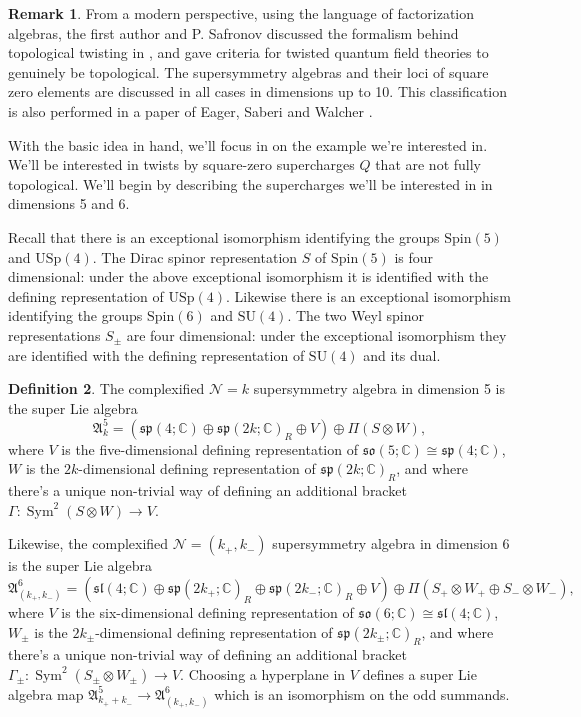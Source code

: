 \documentclass[11pt, oneside, reqno]{amsart}
\theoremstyle{definition} \newtheorem{definition}{Definition}[section]
\theoremstyle{definition} \newtheorem{remark}[definition]{Remark}
\theoremstyle{definition} \newtheorem{remarks}[definition]{Remarks}
\theoremstyle{definition} \newtheorem{question}[definition]{Question}
\theoremstyle{definition} \newtheorem*{note}{Note}
\theoremstyle{definition} \newtheorem{example}[definition]{Example}
\theoremstyle{definition} \newtheorem{examples}[definition]{Examples}
\newcommand{\mr}[1]{\mathrm{#1}}
\newcommand{\mc}[1]{\mathcal{#1}}
\newcommand{\mf}[1]{\mathfrak{#1}}
\newcommand{\CC}{\mathbb{C}}
\newcommand{\SU}{\mathrm{SU}}
\newcommand{\Spin}{\mathrm{Spin}}
\newcommand{\so}{\mathfrak{so}}
\renewcommand{\sl}{\mathfrak{sl}}
\renewcommand{\sp}{\mathfrak{sp}}
\newcommand{\iso}{\cong}
\DeclareMathOperator{\sym}{Sym}
\begin{document}
\begin{remark}
From a modern perspective, using the language of factorization algebras, the first author and P. Safronov discussed the formalism behind topological twisting in \cite{ElliottSafronov}, and gave criteria for twisted quantum field theories to genuinely be topological.  The supersymmetry algebras and their loci of square zero elements are discussed in all cases in dimensions up to 10.  This classification is also performed in a paper of Eager, Saberi and Walcher \cite{EagerSaberiWalcher}.
\end{remark}

With the basic idea in hand, we'll focus in on the example we're interested in.  We'll be interested in twists by square-zero supercharges $Q$ that are not fully topological.  We'll begin by describing the supercharges we'll be interested in in dimensions 5 and 6.

Recall that there is an exceptional isomorphism identifying the groups $\Spin(5)$ and $\mr{USp}(4)$.  The Dirac spinor representation $S$ of $\Spin(5)$ is four dimensional: under the above exceptional isomorphism it is identified with the defining representation of $\mr{USp}(4)$.  Likewise there is an exceptional isomorphism identifying the groups $\Spin(6)$ and $\SU(4)$.  The two Weyl spinor representations $S_\pm$ are four dimensional: under the exceptional isomorphism they are identified with the defining representation of $\SU(4)$ and its dual.

\begin{definition}
The complexified $\mc N=k$ supersymmetry algebra in dimension 5 is the super Lie algebra
\[\mf A^5_k = (\sp(4;\CC) \oplus \sp(2k;\CC)_R \oplus V) \oplus \Pi(S \otimes W),\]
where $V$ is the five-dimensional defining representation of $\so(5;\CC) \iso \sp(4;\CC)$, $W$ is the $2k$-dimensional defining representation of $\sp(2k;\CC)_R$, and where there's a unique non-trivial way of defining an additional bracket $\Gamma \colon \sym^2(S \otimes W) \to V$.

Likewise, the complexified $\mc N=(k_+,k_-)$ supersymmetry algebra in dimension 6 is the super Lie algebra
\[\mf A^6_{(k_+,k_-)} = (\sl(4;\CC) \oplus \sp(2k_+;\CC)_{R} \oplus \sp(2k_-;\CC)_R \oplus V) \oplus \Pi(S_+ \otimes W_+ \oplus S_- \otimes W_-),\]
where $V$ is the six-dimensional defining representation of $\so(6;\CC) \iso \sl(4;\CC)$, $W_\pm$ is the $2k_\pm$-dimensional defining representation of $\sp(2k_\pm;\CC)_R$, and where there's a unique non-trivial way of defining an additional bracket $\Gamma_\pm \colon \sym^2(S_\pm \otimes W_\pm) \to V$.  Choosing a hyperplane in $V$ defines a super Lie algebra map $\mf A^5_{k_+ + k_-} \to \mf A^6_{(k_+,k_-)}$ which is an isomorphism on the odd summands.
\end{definition}
\end{document}

